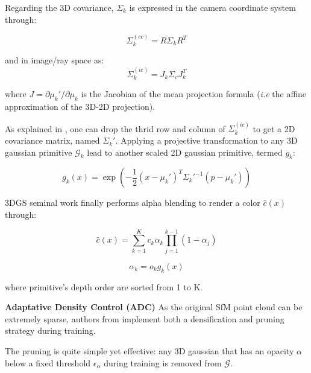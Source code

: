 Regarding the 3D covariance, $\Sigma_{k}$ is expressed in the camera coordinate system through: 

\begin{equation}
  \Sigma_{k}^{(cc)}= R\Sigma_{k}R^{T}
  \label{eq:gs-3dcov-transfrom}
\end{equation}

and in image/ray space as:
\begin{equation}
  \Sigma_{k}^{(ic)}= J_{k}\Sigma_{c}J_{k}^{T}
  \label{eq:gs-3d2dcov}
\end{equation}

where $J = \partial \mu_{k}' / \partial \mu_{k}$ is the Jacobian of the mean projection formula (\textit{i.e} the affine approximation of the 3D-2D projection).


As explained in \cite{zwicker2001ewa}, one can drop the thrid row and column of $\Sigma_{k}^{(ic)}$ to get a 2D covariance matrix, named $\Sigma_{k}'$. Applying a projective transformation to any 3D gaussian primitive $\mathcal{G}_{k}$ lead to another scaled 2D gaussian primitive, termed $g_{k}$: 

\begin{equation}
  g_{k}(x) = \exp(-\frac{1}{2}(x-\mu_{k}')^{T}\Sigma_{k}'^{-1}(p-\mu_{k}'))
\end{equation}

3DGS seminal work \cite{kerbl20233d} finally performs alpha blending to render a color $\hat{c}(x)$ through: 

\begin{equation}
\label{eq:gs-alpha-blending}
  \hat{c}(x) = \sum_{k=1}^{K}c_{k}\alpha_{k}\prod_{j=1}^{k-1}(1-\alpha_{j})
\end{equation}

\begin{equation}
\label{eq:gs-alpha-def}
  \alpha_{k} = o_{k}g_{k}(x)
\end{equation}

where primitive’s depth order are sorted from 1 to K. \newline

\noindent \textbf{Adaptative Density Control (ADC)} 
As the original SfM point cloud can be extremely sparse, authors from \cite{kerbl20233d} implement both a densification and pruning strategy during training. 

The pruning is quite simple yet effective: any 3D gaussian that has an opacity $\alpha$ below a fixed threshold $\epsilon_{\alpha}$ during training is removed from $\mathcal{G}$. 


